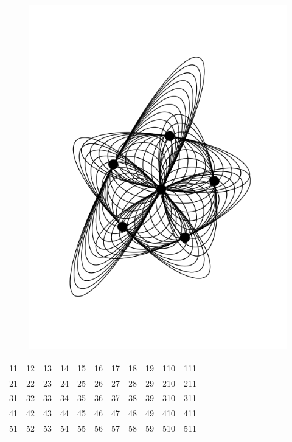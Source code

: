 \documentclass[11pt]{article}
\begin{document}
\begin{figure}[htp]
\centering
\includegraphics[scale=0.80]{img/science_fiction_directories.png}
\caption{}
\label{}
\end{figure}


\begin{tabular}{lllllllllll}
	11 & 12 & 13 & 14 & 15 & 16 & 17 & 18 & 19 & 110 & 111\\
	21 & 22 & 23 & 24 & 25 & 26 & 27 & 28 & 29 & 210 & 211\\
	31 & 32 & 33 & 34 & 35 & 36 & 37 & 38 & 39 & 310 & 311\\
	41 & 42 & 43 & 44 & 45 & 46 & 47 & 48 & 49 & 410 & 411\\
	51 & 52 & 53 & 54 & 55 & 56 & 57 & 58 & 59 & 510 & 511\\
\end{tabular}
\end{document}
